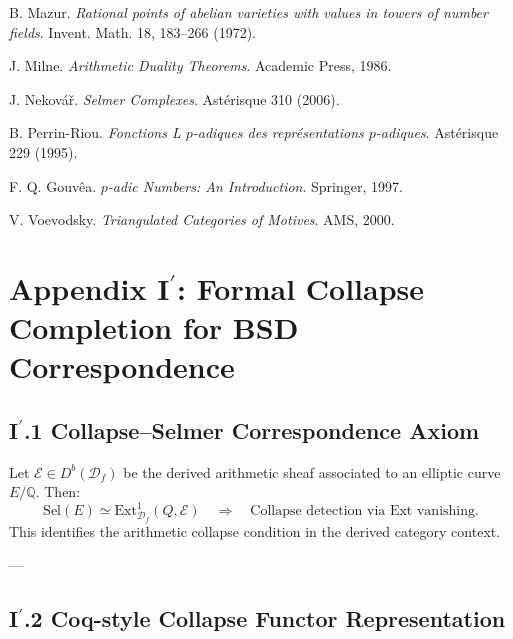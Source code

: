 \documentclass[11pt]{article}
\begin{document}
\begin{thebibliography}{9}

B. Mazur.  
\textit{Rational points of abelian varieties with values in towers of number fields}.  
Invent. Math. 18, 183–266 (1972).

J. Milne.  
\textit{Arithmetic Duality Theorems}. Academic Press, 1986.

J. Nekovář.  
\textit{Selmer Complexes}. Astérisque 310 (2006).

B. Perrin-Riou.  
\textit{Fonctions L $p$-adiques des représentations $p$-adiques}. Astérisque 229 (1995).

F. Q. Gouvêa.  
\textit{$p$-adic Numbers: An Introduction}. Springer, 1997.

V. Voevodsky.  
\textit{Triangulated Categories of Motives}. AMS, 2000.

\end{thebibliography}



\section*{Appendix I$^\prime$: Formal Collapse Completion for BSD Correspondence}

\subsection*{I$^\prime$.1 Collapse–Selmer Correspondence Axiom}

\begin{axiom}
Let \( \mathcal{E} \in D^b(\mathcal{D}_f) \) be the derived arithmetic sheaf associated to an elliptic curve \( E/\mathbb{Q} \). Then:
\[
\mathrm{Sel}(E) \simeq \mathrm{Ext}^1_{\mathcal{D}_f}(Q, \mathcal{E}) \quad \Rightarrow \quad \text{Collapse detection via Ext vanishing.}
\]
This identifies the arithmetic collapse condition in the derived category context.
\end{axiom}

---

\subsection*{I$^\prime$.2 Coq-style Collapse Functor Representation}
\end{document}
